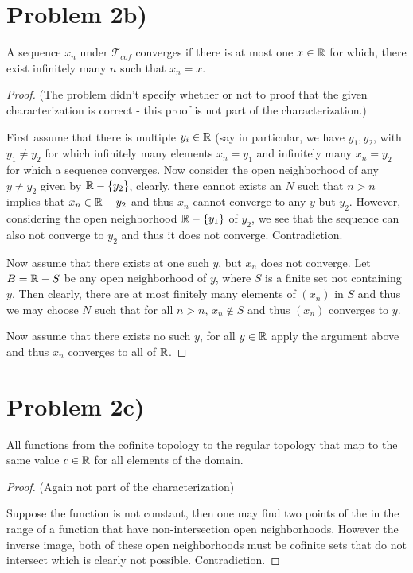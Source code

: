 \section*{Problem 2b)}
A sequence $x_n$ under $\mathcal{T}_{cof}$ converges if there is at most one $x\in \mathbb{R}$ for which, there exist infinitely many $n$ such that $x_n=x$. 
\begin{proof}
(The problem didn't specify whether or not to proof that the given characterization is correct - this proof is not part of the characterization.) \par

First assume that there is multiple $y_i\in \mathbb{R}$ (say in particular, we have $y_1, y_2$, with $y_1\neq y_2$ for which infinitely many elements $x_n = y_1$ and infinitely many $x_n=y_2$ for which a sequence converges. Now consider the open neighborhood of any $y\neq y_2$ given by $\mathbb{R}-\{y_2\}$, clearly, there cannot exists an $N$ such that $n>n$ implies that $x_n \in \mathbb{R}-{y_2}$ and thus $x_n$ cannot converge to any $y$ but $y_2$. However, considering the open neighborhood $\mathbb{R}-\{y_1\}$ of $y_2$, we see that the sequence can also not converge to $y_2$ and thus it does not converge. Contradiction. \par

Now assume that there exists at one such $y$, but $x_n$ does not converge. Let $B=\mathbb{R}-S$ be any open neighborhood of $y$, where $S$ is a finite set not containing $y$. Then clearly, there are at most finitely many elements of $(x_n)$ in $S$ and thus we may choose $N$ such that for all $n>n$, $x_n\notin S$ and thus $(x_n)$ converges to $y$. \par 

Now assume that there exists no such $y$, for all $y\in \mathbb{R}$ apply the argument above and thus $x_n$ converges to all of $\mathbb{R}$. 
\end{proof}
\section*{Problem 2c)}
All functions from the cofinite topology to the regular topology that map to the same value $c\in\mathbb{R}$ for all elements of the domain.
\begin{proof}
(Again not part of the characterization) \par 
Suppose the function is not constant, then one may find two points of the in the range of a function that have non-intersection open neighborhoods. However the inverse image, both of these open neighborhoods must be cofinite sets that do not intersect which is clearly not possible. Contradiction. 
\end{proof}
